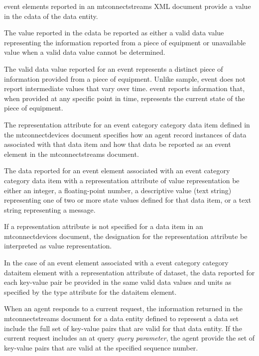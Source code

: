 \gls{event} elements reported in an \gls{mtconnectstreams} XML document \must provide a value in the \gls{cdata} of the \gls{data entity}.

The value reported in the \gls{cdata} \must be reported as either a \gls{valid data value} representing the information reported from a piece of equipment or \gls{unavailable value} when a \gls{valid data value} cannot be determined.

The \gls{valid data value} reported for an \gls{event} represents a distinct piece of information provided from a piece of equipment.  Unlike \gls{sample}, \gls{event} does not report intermediate values that vary over time.  \gls{event} reports information that, when provided at any specific point in time, represents the current state of the piece of equipment.

The \gls{representation} attribute for an \gls{event category} category data item defined in the \gls{mtconnectdevices} document specifies how an \gls{agent} \must record instances of data associated with that data item and how that data \must be reported as an \gls{event} element in the \gls{mtconnectstreams} document.

The data reported for an \gls{event} element associated with an \gls{event category} category data item with a \gls{representation} attribute of \gls{value representation} \must be either an integer, a floating-point number, a descriptive value (text string) representing one of two or more state values defined for that data item, or a text string representing a message.

If a \gls{representation} attribute is not specified for a data item in an \gls{mtconnectdevices} document, the designation for the \gls{representation} attribute \must be interpreted as \gls{value representation}.

In the case of an \gls{event} element associated with a \gls{event category} category \gls{dataitem} element with a \gls{representation} attribute of \gls{dataset}, the data reported for each \gls{key-value pair} \MUST be provided in the same \glspl{valid data value} and units as specified by the \gls{type} attribute for the \gls{dataitem} element.

When an \gls{agent} responds to a \gls{current request}, the information returned in the \gls{mtconnectstreams} document for a \gls{data entity} defined to represent a \gls{data set} \MUST include the full set of \glspl{key-value pair} that are valid for that \gls{data entity}. If the \gls{current request} includes an \gls{at query} \textit{query parameter}, the \gls{agent} \MUST provide the set of \glspl{key-value pair} that are valid at the specified \gls{sequence number}.

